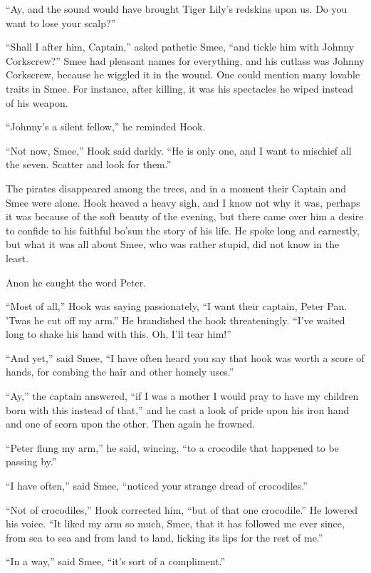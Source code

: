 ``Ay, and the sound would have brought Tiger Lily's redskins upon us. Do
you want to lose your scalp?''

``Shall I after him, Captain,'' asked pathetic Smee, ``and tickle him with
Johnny Corkscrew?'' Smee had pleasant names for everything, and his
cutlass was Johnny Corkscrew, because he wiggled it in the wound. One
could mention many lovable traits in Smee. For instance, after killing,
it was his spectacles he wiped instead of his weapon.

``Johnny's a silent fellow,'' he reminded Hook.

``Not now, Smee,'' Hook said darkly. ``He is only one, and I want to
mischief all the seven. Scatter and look for them.''

The pirates disappeared among the trees, and in a moment their Captain
and Smee were alone. Hook heaved a heavy sigh, and I know not why it
was, perhaps it was because of the soft beauty of the evening, but
there came over him a desire to confide to his faithful bo'sun the
story of his life. He spoke long and earnestly, but what it was all
about Smee, who was rather stupid, did not know in the least.

Anon he caught the word Peter.

``Most of all,'' Hook was saying passionately, ``I want their captain,
Peter Pan. 'Twas he cut off my arm.'' He brandished the hook
threateningly. ``I've waited long to shake his hand with this. Oh, I'll
tear him!''

``And yet,'' said Smee, ``I have often heard you say that hook was worth a
score of hands, for combing the hair and other homely uses.''

``Ay,'' the captain answered, ``if I was a mother I would pray to have my
children born with this instead of that,'' and he cast a look of pride
upon his iron hand and one of scorn upon the other. Then again he
frowned.

``Peter flung my arm,'' he said, wincing, ``to a crocodile that happened
to be passing by.''

``I have often,'' said Smee, ``noticed your strange dread of crocodiles.''

``Not of crocodiles,'' Hook corrected him, ``but of that one crocodile.''
He lowered his voice. ``It liked my arm so much, Smee, that it has
followed me ever since, from sea to sea and from land to land, licking
its lips for the rest of me.''

``In a way,'' said Smee, ``it's sort of a compliment.''

